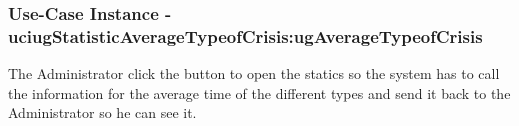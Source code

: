 
	\subsubsection{Use-Case Instance - uciugStatisticAverageTypeofCrisis:ugAverageTypeofCrisis}
	
	The Administrator click the button to open the statics so the system has to call the information for the average time of the different types and send it back to the Administrator so he can see it. 		  
	\begin{operationmodel}
	
	\end{operationmodel} 

	
